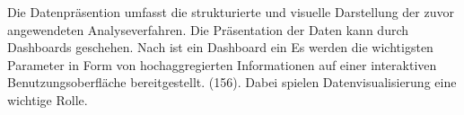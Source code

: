 Die Datenpräsention umfasst die strukturierte und visuelle Darstellung der zuvor angewendeten Analyseverfahren.
Die Präsentation der Daten kann durch Dashboards geschehen. Nach  ist ein Dashboard ein \cite{few_information_2006} Es werden die wichtigsten Parameter in Form von hochaggregierten
Informationen auf einer interaktiven Benutzungsoberfläche bereitgestellt. (156). Dabei spielen Datenvisualisierung eine wichtige Rolle. 









        
